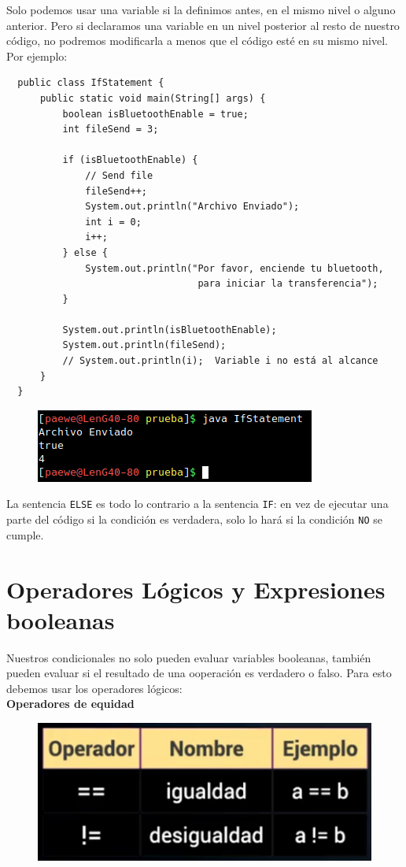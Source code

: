 \documentclass{article}
\begin{document}
Solo podemos usar una variable si la definimos antes, en el mismo nivel o
alguno anterior. Pero si declaramos una variable en un nivel posterior al resto
de nuestro código, no podremos modificarla a menos que el código esté en su
mismo nivel.\\

Por ejemplo:\\

\begin{verbatim}
  public class IfStatement {
      public static void main(String[] args) {
          boolean isBluetoothEnable = true;
          int fileSend = 3;

          if (isBluetoothEnable) {
              // Send file
              fileSend++;
              System.out.println("Archivo Enviado");
              int i = 0;
              i++;
          } else {
              System.out.println("Por favor, enciende tu bluetooth,
                                  para iniciar la transferencia");
          }

          System.out.println(isBluetoothEnable);
          System.out.println(fileSend);
          // System.out.println(i);  Variable i no está al alcance
      }
  }
\end{verbatim}

\begin{figure}[h!]
  \centering
  \includegraphics[scale=0.75]{./Pictures/046_alcance.png}
\end{figure}

La sentencia \texttt{ELSE} es todo lo contrario a la sentencia \texttt{IF}: en
vez de ejecutar una parte del código si la condición es verdadera, solo lo hará
si la condición \texttt{NO} se cumple.


\section{Operadores Lógicos y Expresiones booleanas}%
Nuestros condicionales no solo pueden evaluar variables booleanas, también
pueden evaluar si el resultado de una ooperación es verdadero o falso. Para
esto debemos usar los operadores lógicos:\\

\textbf{Operadores de equidad}\\
\begin{figure}[h!]
  \centering
  \includegraphics[scale=0.75]{./Pictures/019_equidad.png}
\end{figure}
\end{document}
